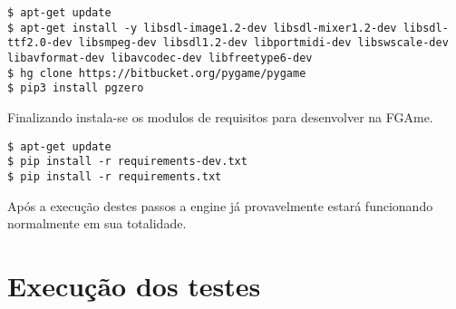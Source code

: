 \begin{lstlisting}
$ apt-get update
$ apt-get install -y libsdl-image1.2-dev libsdl-mixer1.2-dev libsdl-ttf2.0-dev libsmpeg-dev libsdl1.2-dev libportmidi-dev libswscale-dev libavformat-dev libavcodec-dev libfreetype6-dev
$ hg clone https://bitbucket.org/pygame/pygame
$ pip3 install pgzero
\end{lstlisting}

Finalizando instala-se os modulos de requisitos para desenvolver na FGAme.

\begin{lstlisting}
$ apt-get update
$ pip install -r requirements-dev.txt
$ pip install -r requirements.txt
\end{lstlisting}

Após a execução destes passos a engine já provavelmente estará funcionando normalmente em sua totalidade.

\section{Execução dos testes}

